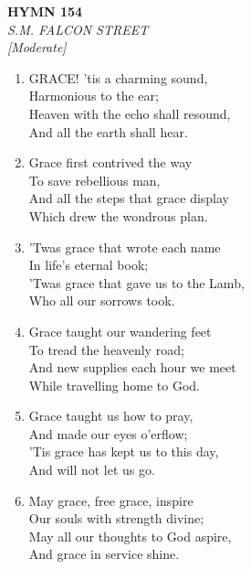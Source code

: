 \newpage
\begin{center}
    {\Large \textbf{HYMN 154}}
    \\
    \textit{S.M. FALCON STREET}
    \\
    \textit{\small [Moderate]}
\end{center}
\vspace{1em}

\begin{enumerate}
    \item GRACE! 'tis a charming sound, \\
        Harmonious to the ear; \\
        Heaven with the echo shall resound, \\
        And all the earth shall hear.

    \item Grace first contrived the way \\
        To save rebellious man, \\
        And all the steps that grace display \\
        Which drew the wondrous plan.

    \item 'Twas grace that wrote each name \\
        In life's eternal book; \\
        'Twas grace that gave us to the Lamb, \\
        Who all our sorrows took.

    \item Grace taught our wandering feet \\
        To tread the heavenly road; \\
        And new supplies each hour we meet \\
        While travelling home to God.

    \item Grace taught us how to pray, \\
        And made our eyes o'erflow; \\
        'Tis grace has kept us to this day, \\
        And will not let us go.

    \item May grace, free grace, inspire \\
        Our souls with strength divine; \\
        May all our thoughts to God aspire, \\
        And grace in service shine.


\end{enumerate}
